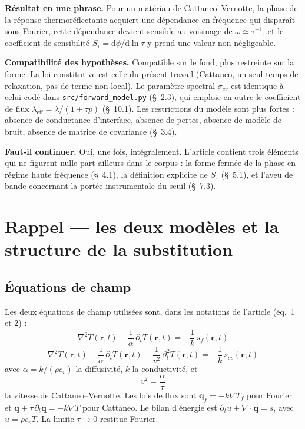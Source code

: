 \documentclass[11pt,a4paper]{article}
\newcommand{\code}[1]{\texttt{\small #1}}
\begin{document}
\textbf{Résultat en une phrase.} Pour un matériau de Cattaneo--Vernotte, la phase de la réponse
thermoréflectante acquiert une dépendance en fréquence qui disparaît sous Fourier, cette
dépendance devient sensible au voisinage de $\omega \simeq \tau^{-1}$, et le coefficient de
sensibilité $S_\tau = \mathrm{d}\phi/\mathrm{d}\ln\tau$ y prend une valeur non négligeable.

\textbf{Compatibilité des hypothèses.} Compatible sur le fond, plus restreinte sur la forme.
La loi constitutive est celle du présent travail (Cattaneo, un seul temps de relaxation, pas de
terme non local). Le paramètre spectral $\sigma_{cv}$ est identique à celui codé dans
\code{src/\allowbreak forward\_model.py} (§~2.3), qui emploie en outre le coefficient de flux
$\lambda_{\mathrm{eff}}=\lambda/(1+\tau p)$ (§~10.1). Les restrictions du modèle sont plus fortes : absence de
conductance d'interface, absence de pertes, absence de modèle de bruit, absence de matrice de
covariance (§~3.4).

\textbf{Faut-il continuer.} Oui, une fois, intégralement. L'article contient trois éléments qui
ne figurent nulle part ailleurs dans le corpus : la forme fermée de la phase en régime haute
fréquence (§~4.1), la définition explicite de $S_\tau$ (§~5.1), et l'aveu de bande concernant
la portée instrumentale du seuil (§~7.3).

\section{Rappel --- les deux modèles et la structure de la substitution}

\subsection{Équations de champ}

Les deux équations de champ utilisées sont, dans les notations de l'article (éq.~1 et 2) :
\[
\nabla^2 T(\mathbf r, t) - \frac{1}{\alpha}\,\partial_t T(\mathbf r, t)
= -\frac{1}{k}\, s_f(\mathbf r, t)
\]
\[
\nabla^2 T(\mathbf r, t) - \frac{1}{\alpha}\,\partial_t T(\mathbf r, t)
- \frac{1}{v^2}\,\partial_t^2 T(\mathbf r, t) = -\frac{1}{k}\, s_{cv}(\mathbf r, t)
\]
avec $\alpha = k/(\rho c_v)$ la diffusivité, $k$ la conductivité, et
\[
v^2 = \frac{\alpha}{\tau}
\]
la vitesse de Cattaneo--Vernotte. Les lois de flux sont $\mathbf q_f = -k\nabla T_f$ pour
Fourier et $\mathbf q + \tau\,\partial_t \mathbf q = -k\nabla T$ pour Cattaneo. Le bilan
d'énergie est $\partial_t u + \nabla\!\cdot\mathbf q = s$, avec $u = \rho c_v T$. La limite
$\tau \to 0$ restitue Fourier.
\end{document}

